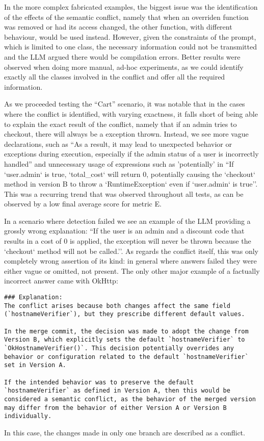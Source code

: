 In the more complex fabricated examples, the biggest issue was the identification of the effects of the semantic conflict, namely that when an overriden function was removed or had its access changed, the other function, with different behaviour, would be used instead. However, given the constraints of the prompt, which is limited to one class, the necessary information could not be transmitted and the LLM argued there would be compilation errors. 
Better results were observed when doing more manual, ad-hoc experiments, as we could identify exactly all the classes involved in the conflict and offer all the required information.

As we proceeded testing the ``Cart'' scenario, it was notable that in the cases where the conflict is identified, with varying exactness, it falls short of being able to explain the exact result of the conflict, namely that if an admin tries to checkout, there will always be a exception thrown. Instead, we see more vague declarations, such as ``As a result, it may lead to unexpected behavior or exceptions during execution, especially if the admin status of a user is incorrectly handled'' and unnecessary usage of expressions such as 'potentially' in ``If `user.admin` is true, `total\_cost` will return 0, potentially causing the `checkout` method in version B to throw a `RuntimeException` even if `user.admin` is true''.
This was a recurring trend that was observed throughout all tests, as can be observed by a low final average score for metric E.

In a scenario where detection failed we see an example of the LLM providing a grossly wrong explanation: ``If the user is an admin and a discount code that results in a cost of 0 is applied, the exception will never be thrown because the `checkout` method will not be called.''. As regards the conflict itself, this was only completely wrong assertion of its kind: in general where answers failed they were either vague or omitted, not present. The only other major example of a factually incorrect answer came with OkHttp:
\begin{lstlisting}
### Explanation:
The conflict arises because both changes affect the same field (`hostnameVerifier`), but they prescribe different default values.
    
In the merge commit, the decision was made to adopt the change from Version B, which explicitly sets the default `hostnameVerifier` to `OkHostnameVerifier()`. This decision potentially overrides any behavior or configuration related to the default `hostnameVerifier` set in Version A.
    
If the intended behavior was to preserve the default `hostnameVerifier` as defined in Version A, then this would be considered a semantic conflict, as the behavior of the merged version may differ from the behavior of either Version A or Version B individually.
\end{lstlisting}
In this case, the changes made in only one branch are described as a conflict.

